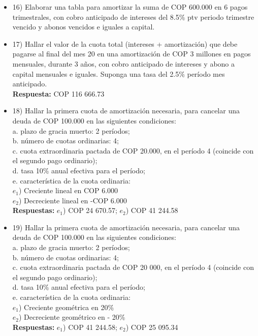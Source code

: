 \begin{itemize}
 \item 16)	 Elaborar una tabla para amortizar la suma de COP 600.000 en 6 pagos trimestrales, con cobro anticipado de intereses del 8.5\% ptv periodo trimestre vencido y abonos vencidos e iguales a capital.
       \medskip

 \item 17)   Hallar el valor de la cuota total (intereses + amortización) que debe pagarse al final del mes 20 en una amortización de COP 3 millones en pagos mensuales, durante 3 años, con cobro anticipado de intereses y abono a capital mensuales e iguales. Suponga una tasa del 2.5\% período mes anticipado.\\
       \textbf{Respuesta: }COP 116 666.73
       \medskip

 \item 18)	 Hallar la primera cuota de amortización necesaria, para cancelar una deuda de COP 100.000 en las siguientes condiciones:\\
       a. plazo de gracia muerto: 2 períodos; \\
       b. número de cuotas ordinarias: 4; \\
       c. cuota extraordinaria pactada de COP 20.000, en el período 4 (coincide con el segundo pago ordinario); \\
       d. tasa 10\% anual efectiva para el período; \\
       e. característica de la cuota ordinaria:\\
       $e_{1}$)  Creciente lineal en COP 6.000 \\
       $e_{2}$)  Decreciente lineal en -COP 6.000\\
       \textbf{Respuestas:} $e_{1}$)  COP 24 670.57;  $e_{2}$)  COP 41 244.58
       \medskip

 \item 19) Hallar la primera cuota de amortización necesaria, para cancelar una deuda de COP 100.000 en las siguientes condiciones:\\
       a.	plazo de gracia muerto: 2 períodos; \\
       b.	número de cuotas ordinarias: 4;\\
       c.	cuota extraordinaria pactada de COP 20 000, en el período 4 (coincide con el segundo pago ordinario); \\
       d.	tasa 10\% anual efectiva para el período; \\
       e.	característica de la cuota ordinaria:\\
       $e_{1}$)  Creciente geométrica en 20\%\\
       $e_{2}$)  Decreciente geométrico en - 20\%\\
       \textbf{Respuestas: }$e_{1}$)  COP 41 244.58;  $e_{2}$)  COP 25 095.34\\
       \medskip


\end{itemize}
